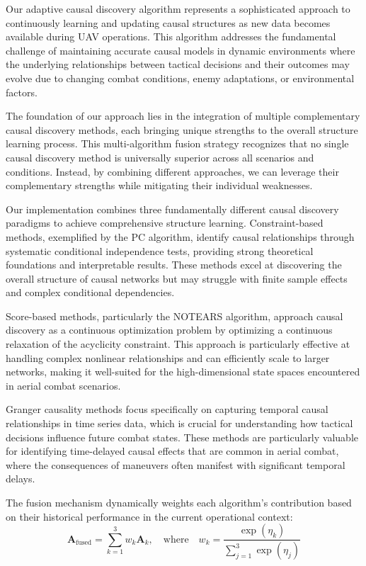 \documentclass[12pt]{article}
\begin{document}
Our adaptive causal discovery algorithm represents a sophisticated approach to continuously learning and updating causal structures as new data becomes available during UAV operations. This algorithm addresses the fundamental challenge of maintaining accurate causal models in dynamic environments where the underlying relationships between tactical decisions and their outcomes may evolve due to changing combat conditions, enemy adaptations, or environmental factors.

The foundation of our approach lies in the integration of multiple complementary causal discovery methods, each bringing unique strengths to the overall structure learning process. This multi-algorithm fusion strategy recognizes that no single causal discovery method is universally superior across all scenarios and conditions. Instead, by combining different approaches, we can leverage their complementary strengths while mitigating their individual weaknesses.

Our implementation combines three fundamentally different causal discovery paradigms to achieve comprehensive structure learning. Constraint-based methods, exemplified by the PC algorithm, identify causal relationships through systematic conditional independence tests, providing strong theoretical foundations and interpretable results. These methods excel at discovering the overall structure of causal networks but may struggle with finite sample effects and complex conditional dependencies.

Score-based methods, particularly the NOTEARS algorithm, approach causal discovery as a continuous optimization problem by optimizing a continuous relaxation of the acyclicity constraint. This approach is particularly effective at handling complex nonlinear relationships and can efficiently scale to larger networks, making it well-suited for the high-dimensional state spaces encountered in aerial combat scenarios.

Granger causality methods focus specifically on capturing temporal causal relationships in time series data, which is crucial for understanding how tactical decisions influence future combat states. These methods are particularly valuable for identifying time-delayed causal effects that are common in aerial combat, where the consequences of maneuvers often manifest with significant temporal delays.

The fusion mechanism dynamically weights each algorithm's contribution based on their historical performance in the current operational context:
\begin{equation}
\mathbf{A}_{\text{fused}} = \sum_{k=1}^{3} w_k \mathbf{A}_k, \quad \text{where} \quad w_k = \frac{\exp(\eta_k)}{\sum_{j=1}^{3} \exp(\eta_j)}
\end{equation}
\end{document}
